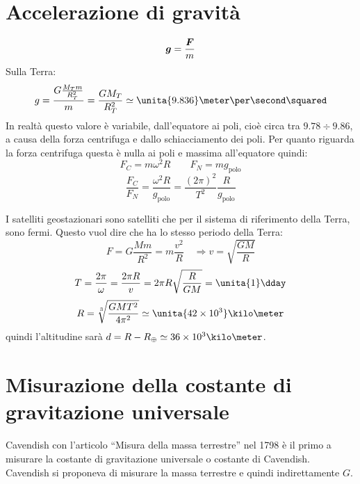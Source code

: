 \section{Accelerazione di gravità}
\begin{equation*}\boldsymbol{g}=\frac{\boldsymbol{F}}{m}\end{equation*}
Sulla Terra: \begin{equation*}g = \frac{G\frac{M_Tm}{R_T^2}}{m}=\frac{GM_T}{R_T^2}\simeq \unita{9.836}\meter\per\second\squared\end{equation*}
In realtà questo valore è variabile, dall'equatore ai poli, cioè
circa tra $9.78\div9.86$, a causa della forza centrifuga e dallo
schiacciamento dei poli. Per quanto riguarda la forza centrifuga
questa è nulla ai poli e massima all'equatore quindi:
\begin{equation*}F_C=m\omega^2R\qquad F_N=mg_{\text{polo}}\end{equation*}
\begin{equation*}\frac{F_C}{F_N}=\frac{\omega^2R}{g_{\text{polo}}}=\frac{(2\pi)^2}{T^2}\frac{R}{g_{\text{polo}}}\end{equation*}
\begin{Es}
 I satelliti geostazionari sono satelliti che per il sistema di riferimento della Terra, sono fermi. Questo vuol dire che ha lo stesso periodo della Terra:
\begin{equation*}
 F = G\frac{Mm}{R^2} = m\frac{v^2}{R}\quad\Rightarrow v=\sqrt{\frac{GM}{R}}
\end{equation*}
\begin{equation*}
 T = \frac{2 \pi}{\omega} = \frac{2\pi R}{v} = 2\pi R\sqrt{\frac{R}{GM}} = \unita{1}\dday
\end{equation*}
\begin{equation*}
 R = \sqrt[3]{\frac{GMT^2}{4\pi^2}}\simeq \unita{42\times 10^3}\kilo\meter
\end{equation*}
quindi l'altitudine sarà $d = R - R_\oplus\simeq 36\times 10^3\kilo\meter$.
\end{Es}

\section{Misurazione della costante di gra\-vi\-ta\-zio\-ne u\-ni\-ver\-sa\-le}
Cavendish con l'articolo ``Misura della massa terrestre'' nel
1798 è il primo a misurare la costante di gravitazione universale
o costante di Cavendish. Cavendish si proponeva di misurare la
massa terrestre e quindi indirettamente $G$.

